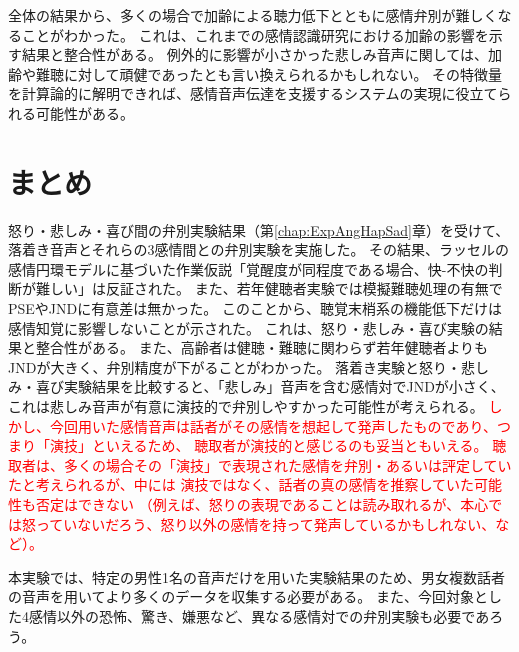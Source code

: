全体の結果から、多くの場合で加齢による聴力低下とともに感情弁別が難しくなることがわかった。
これは、これまでの感情認識研究における加齢の影響を示す結果と整合性がある。
例外的に影響が小さかった悲しみ音声に関しては、加齢や難聴に対して頑健であったとも言い換えられるかもしれない。
その特徴量を計算論的に解明できれば、感情音声伝達を支援するシステムの実現に役立てられる可能性がある。





\section{まとめ}
怒り・悲しみ・喜び間の弁別実験結果（第\ref{chap:ExpAngHapSad}章）を受けて、落着き音声とそれらの3感情間との弁別実験を実施した。
その結果、ラッセルの感情円環モデルに基づいた作業仮説「覚醒度が同程度である場合、快-不快の判断が難しい」は反証された。
また、若年健聴者実験では模擬難聴処理の有無でPSEやJNDに有意差は無かった。
このことから、聴覚末梢系の機能低下だけは感情知覚に影響しないことが示された。
これは、怒り・悲しみ・喜び実験の結果と整合性がある。
また、高齢者は健聴・難聴に関わらず若年健聴者よりもJNDが大きく、弁別精度が下がることがわかった。
落着き実験と怒り・悲しみ・喜び実験結果を比較すると、「悲しみ」音声を含む感情対でJNDが小さく、
これは悲しみ音声が有意に演技的で弁別しやすかった可能性が考えられる。
\textcolor{red}{
  しかし、今回用いた感情音声は話者がその感情を想起して発声したものであり、つまり「演技」といえるため、
  聴取者が演技的と感じるのも妥当ともいえる。
  聴取者は、多くの場合その「演技」で表現された感情を弁別・あるいは評定していたと考えられるが、中には
  演技ではなく、話者の真の感情を推察していた可能性も否定はできない
  （例えば、怒りの表現であることは読み取れるが、本心では怒っていないだろう、怒り以外の感情を持って発声しているかもしれない、など）。
}

本実験では、特定の男性1名の音声だけを用いた実験結果のため、男女複数話者の音声を用いてより多くのデータを収集する必要がある。
また、今回対象とした4感情以外の恐怖、驚き、嫌悪など、異なる感情対での弁別実験も必要であろう。




  
